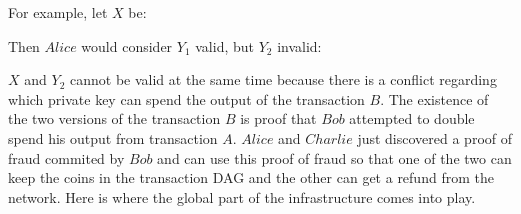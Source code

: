   For example, let $X$ be:
  \begin{center}
    \begin{dot2tex}[outputdir=dot2tex/, file=baseDAG]
      
    \end{dot2tex}
  \end{center}
  Then $Alice$ would consider $Y_1$ valid, but $Y_2$ invalid:
  \begin{center}
    \begin{dot2tex}[outputdir=dot2tex/, file=goodDAG]
      
    \end{dot2tex}
  \end{center}
  \begin{center}
    \begin{dot2tex}[outputdir=dot2tex/, file=badDAG]
      
    \end{dot2tex}
  \end{center}
  $X$ and $Y_2$ cannot be valid at the same time because there is a conflict regarding
  which private key can spend the output of the transaction $B$. The existence of the two
  versions of the transaction $B$ is proof that $Bob$ attempted to double spend his output
  from transaction $A$. $Alice$ and $Charlie$ just discovered a proof of fraud commited by
  $Bob$ and can use this proof of fraud so that one of the two can keep the coins in the
  transaction DAG and the other can get a refund from the network. Here is where the
  global part of the infrastructure comes into play.
